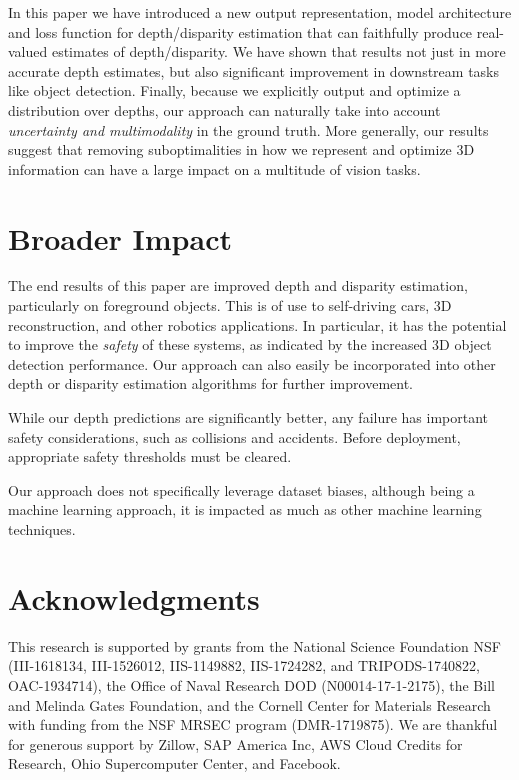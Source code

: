 \documentclass{article}
\begin{document}
In this paper we have introduced a new output representation, model architecture and loss function for depth/disparity estimation that can faithfully produce real-valued estimates of depth/disparity.
We have shown that results not just in more accurate depth estimates, but also significant improvement in downstream tasks like object detection.
Finally, because we explicitly output and optimize a distribution over depths, our approach can naturally take into account \emph{uncertainty and multimodality} in the ground truth.
More generally, our results suggest that removing suboptimalities in how we represent and optimize 3D information can have a large impact on a multitude of vision tasks.
 
\clearpage
\section*{Broader Impact}
The end results of this paper are improved depth and disparity estimation, particularly on foreground objects.
This is of use to self-driving cars, 3D reconstruction, and other robotics applications.  
In particular, it has the potential to improve the \emph{safety} of these systems, as indicated by the increased 3D object detection performance.
Our approach can also easily be incorporated into other depth or disparity estimation algorithms for further improvement.

While our depth predictions are significantly better, any failure has important safety considerations, such as collisions and accidents.
Before deployment, appropriate safety thresholds must be cleared.

Our approach does not specifically leverage dataset biases, although being a machine learning approach, it is impacted as much as other machine learning techniques.

\section*{Acknowledgments}
This research is supported by grants from the National Science Foundation NSF (III-1618134, III-1526012, IIS-1149882, IIS-1724282, and TRIPODS-1740822, OAC-1934714), the Office of Naval Research DOD (N00014-17-1-2175), the Bill and Melinda Gates Foundation, and the Cornell Center for Materials Research with funding from the NSF MRSEC program (DMR-1719875). We are thankful for generous support by Zillow, SAP America Inc, AWS Cloud Credits for Research, Ohio Supercomputer Center, and Facebook.
\end{document}
